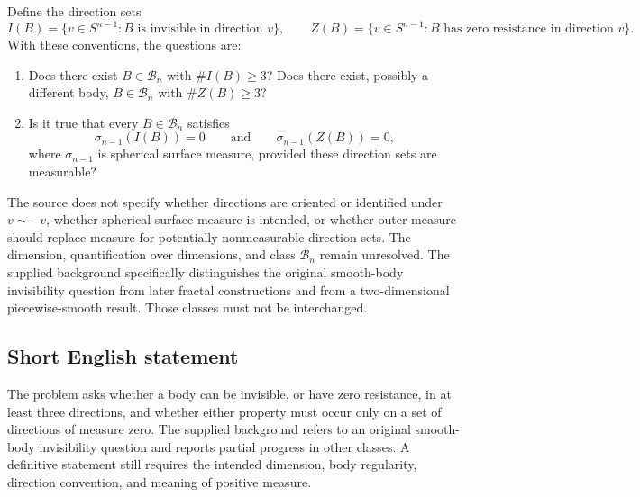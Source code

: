 \documentclass[11pt]{article}
\begin{document}
Define the direction sets
\[
 I(B)=\{v\in S^{n-1}:B\text{ is invisible in direction }v\},\qquad
 Z(B)=\{v\in S^{n-1}:B\text{ has zero resistance in direction }v\}.
\]
With these conventions, the questions are:
\begin{enumerate}
\item Does there exist \(B\in\mathcal B_n\) with \(\#I(B)\geq 3\)? Does there exist, possibly a different body, \(B\in\mathcal B_n\) with \(\#Z(B)\geq 3\)?
\item Is it true that every \(B\in\mathcal B_n\) satisfies
\[
 \sigma_{n-1}(I(B))=0
 \qquad\text{and}\qquad
 \sigma_{n-1}(Z(B))=0,
\]
where \(\sigma_{n-1}\) is spherical surface measure, provided these direction sets are measurable?
\end{enumerate}
The source does not specify whether directions are oriented or identified under \(v\sim -v\), whether spherical surface measure is intended, or whether outer measure should replace measure for potentially nonmeasurable direction sets. The dimension, quantification over dimensions, and class \(\mathcal B_n\) remain unresolved. The supplied background specifically distinguishes the original smooth-body invisibility question from later fractal constructions and from a two-dimensional piecewise-smooth result. Those classes must not be interchanged.
\subsection{Short English statement}
The problem asks whether a body can be invisible, or have zero resistance, in at least three directions, and whether either property must occur only on a set of directions of measure zero. The supplied background refers to an original smooth-body invisibility question and reports partial progress in other classes. A definitive statement still requires the intended dimension, body regularity, direction convention, and meaning of positive measure.
\end{document}
